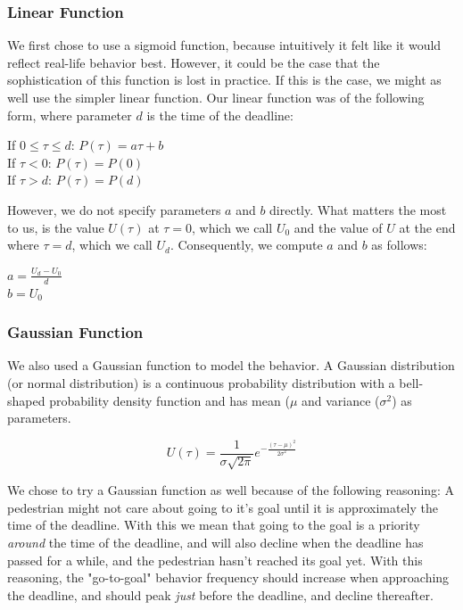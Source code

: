 \documentclass[11pt, a4paper]{book}
\begin{document}
\subsubsection{Linear Function}
We first chose to use a sigmoid function, because intuitively it felt like it would reflect real-life behavior best. However, it could be the case that the sophistication of this function is lost in practice. If this is the case, we might as well use the simpler linear function. Our linear function was of the following form, where parameter $d$ is the time of the deadline:
\begin{minipage}{\textwidth}
\begin{center}
If $0 \leq \tau \leq d$: $P(\tau) = a\tau + b$\\
If $\tau<0$: $P(\tau) = P(0)$\\
If $\tau>d$: $P(\tau) = P(d)$
\end{center}
\end{minipage}
However, we do not specify parameters $a$ and $b$ directly. What matters the most to us, is the value $U(\tau)$ at $\tau=0$, which we call $U_0$ and the value of $U$ at the end where $\tau=d$, which we call $U_d$. Consequently, we compute $a$ and $b$ as follows:
\begin{center}
$a = \frac{U_d - U_0}{d}$\\
$b = U_0$
\end{center}

\subsubsection{Gaussian Function}
We also used a Gaussian function to model the behavior. A Gaussian distribution (or normal distribution) is a continuous probability distribution with a bell-shaped probability density function and has mean ($\mu$ and variance ($\sigma^2$) as parameters.
\begin{center}\[U(\tau)=\frac{1}{\sigma \sqrt{2 \pi}} e^{- \frac{(\tau - \mu)^2}{2\sigma^2}}\]
\end{center}
We chose to try a Gaussian function as well because of the following reasoning: A pedestrian might not care about going to it's goal until it is approximately the time of the deadline. With this we mean that going to the goal is a priority \emph{around} the time of the deadline, and will also decline when the deadline has passed for a while, and the pedestrian hasn't reached its goal yet. With this reasoning, the "go-to-goal" behavior frequency should increase when approaching the deadline, and should peak \emph{just} before the deadline, and decline thereafter.
\end{document}
